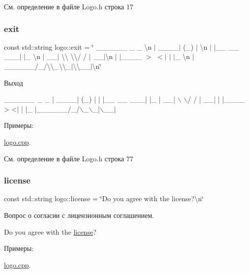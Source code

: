 См. определение в файле Logo.\+h строка 17

\mbox{\label{namespacelogo_aba8ca66bcf8abe6a0991a13887671863}} 
\subsubsection{\texorpdfstring{exit}{exit}}
{\footnotesize\ttfamily const std\+::string logo\+::exit = \char`\"{} \+\_\+\+\_\+\+\_\+\+\_\+\+\_\+\+\_\+ \+\_\+ \+\_\+ \textbackslash{}n $\vert$ \+\_\+\+\_\+\+\_\+\+\_\+$\vert$ (\+\_\+) $\vert$ \textbackslash{}n $\vert$ $\vert$\+\_\+\+\_\+ \+\_\+\+\_\+ \+\_\+\+\_\+\+\_\+$\vert$ $\vert$\+\_\+ \textbackslash{}n $\vert$ \+\_\+\+\_\+$\vert$ \textbackslash{}\textbackslash{} \textbackslash{}\textbackslash{}/ / $\vert$ \+\_\+\+\_\+$\vert$\textbackslash{}n $\vert$ $\vert$\+\_\+\+\_\+\+\_\+\+\_\+ $>$ $<$$\vert$ $\vert$ $\vert$\+\_\+ \textbackslash{}n $\vert$\+\_\+\+\_\+\+\_\+\+\_\+\+\_\+\+\_\+/\+\_\+/\textbackslash{}\textbackslash{}\+\_\+\textbackslash{}\textbackslash{}\+\_\+$\vert$\textbackslash{}\textbackslash{}\+\_\+\+\_\+$\vert$\textbackslash{}n\char`\"{}}

Выход 
\begin{DoxyCode}
 \_\_\_\_\_\_      \_ \_   
|  \_\_\_\_|    (\_) |  
| |\_\_  \_\_  \_\_\_| |\_ 
|  \_\_| \(\backslash\) \(\backslash\)/ / | \_\_|
| |\_\_\_\_ >  <| | |\_ 
|\_\_\_\_\_\_/\_/\(\backslash\)\_\(\backslash\)\_|\(\backslash\)\_\_|
\end{DoxyCode}
 \begin{Desc}
\item[Примеры\+: ]\par
\hyperlink{logo_8cpp-example}{logo.\+cpp}.\end{Desc}


См. определение в файле Logo.\+h строка 77

\mbox{\label{namespacelogo_ae5491adc000fde7d3d8229372c877da2}} 
\subsubsection{\texorpdfstring{license}{license}}
{\footnotesize\ttfamily const std\+::string logo\+::license = \char`\"{}Do you agree with the license?\textbackslash{}n\char`\"{}}

Вопрос о согласии с лицензионным соглашением. 
\begin{DoxyCode}
Do you agree with the \hyperlink{namespacelogo_ae5491adc000fde7d3d8229372c877da2}{license}?
\end{DoxyCode}
 \begin{Desc}
\item[Примеры\+: ]\par
\hyperlink{logo_8cpp-example}{logo.\+cpp}.\end{Desc}


